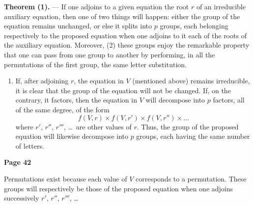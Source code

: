 \documentclass{article}
\begin{document}
\textbf{Theorem (1).} --- If one adjoins to a given equation the root $r$ of an irreducible auxiliary equation, then one of two things will happen: either the group of the equation remains unchanged, or else it splits into $p$ groups, each belonging respectively to the proposed equation when one adjoins to it each of the roots of the auxiliary equation. Moreover, (2) these groups enjoy the remarkable property that one can pass from one group to another by performing, in all the permutations of the first group, the same letter substitution.

\begin{enumerate}
\item If, after adjoining $r$, the equation in $V$ (mentioned above) remains irreducible, it is clear that the group of the equation will not be changed. If, on the contrary, it factors, then the equation in $V$ will decompose into $p$ factors, all of the same degree, of the form
\[
f(V,r) \times f(V,r') \times f(V,r'') \times \dots
\]
where $r'$, $r''$, $r'''$, \dots\ are other values of $r$. Thus, the group of the proposed equation will likewise decompose into $p$ groups, each having the same number of letters.
\end{enumerate}



\newpage

\centerline{\textbf{Page 42}}

\medskip

Permutations exist because each value of $V$ corresponds to a permutation. These groups will respectively be those of the proposed equation when one adjoins successively $r'$, $r''$, $r'''$, \dots
\end{document}
